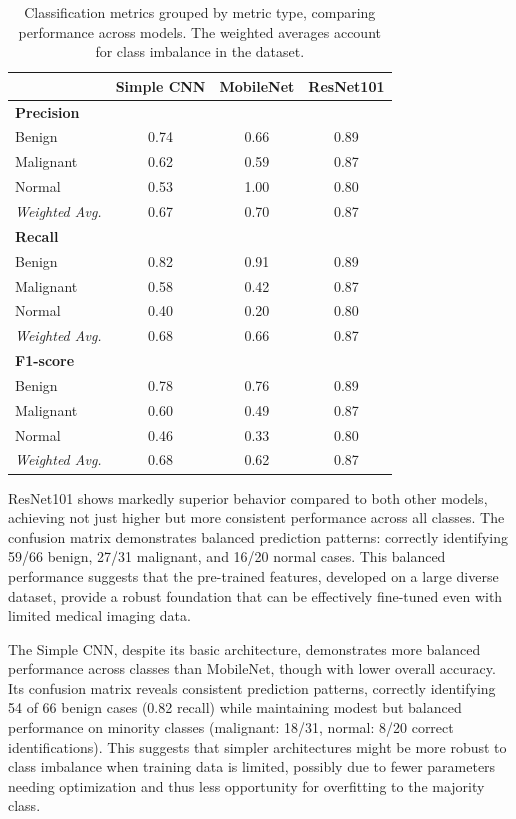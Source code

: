 \begin{table}[h!]
    \centering
    \begin{tabular}{lccc}
        \hline
        & Simple CNN & MobileNet & ResNet101 \\
        \hline
        \multicolumn{4}{l}{\textbf{Precision}} \\
        Benign & 0.74 & 0.66 & 0.89 \\
        Malignant & 0.62 & 0.59 & 0.87 \\
        Normal & 0.53 & 1.00 & 0.80 \\
        \textit{Weighted Avg.} & 0.67 & 0.70 & 0.87 \\
        \hline
        \multicolumn{4}{l}{\textbf{Recall}} \\
        Benign & 0.82 & 0.91 & 0.89 \\
        Malignant & 0.58 & 0.42 & 0.87 \\
        Normal & 0.40 & 0.20 & 0.80 \\
        \textit{Weighted Avg.} & 0.68 & 0.66 & 0.87 \\
        \hline
        \multicolumn{4}{l}{\textbf{F1-score}} \\
        Benign & 0.78 & 0.76 & 0.89 \\
        Malignant & 0.60 & 0.49 & 0.87 \\
        Normal & 0.46 & 0.33 & 0.80 \\
        \textit{Weighted Avg.} & 0.68 & 0.62 & 0.87 \\
        \hline
    \end{tabular}
    \caption{Classification metrics grouped by metric type, comparing performance across models. The weighted averages account for class imbalance in the dataset.}
    \label{tab:classification_metrics}
\end{table}

ResNet101 shows markedly superior behavior compared to both other models, achieving not just higher but more consistent performance across all classes. The confusion matrix demonstrates balanced prediction patterns: correctly identifying 59/66 benign, 27/31 malignant, and 16/20 normal cases. This balanced performance suggests that the pre-trained features, developed on a large diverse dataset, provide a robust foundation that can be effectively fine-tuned even with limited medical imaging data.

The Simple CNN, despite its basic architecture, demonstrates more balanced performance across classes than MobileNet, though with lower overall accuracy. Its confusion matrix reveals consistent prediction patterns, correctly identifying 54 of 66 benign cases (0.82 recall) while maintaining modest but balanced performance on minority classes (malignant: 18/31, normal: 8/20 correct identifications). This suggests that simpler architectures might be more robust to class imbalance when training data is limited, possibly due to fewer parameters needing optimization and thus less opportunity for overfitting to the majority class.

